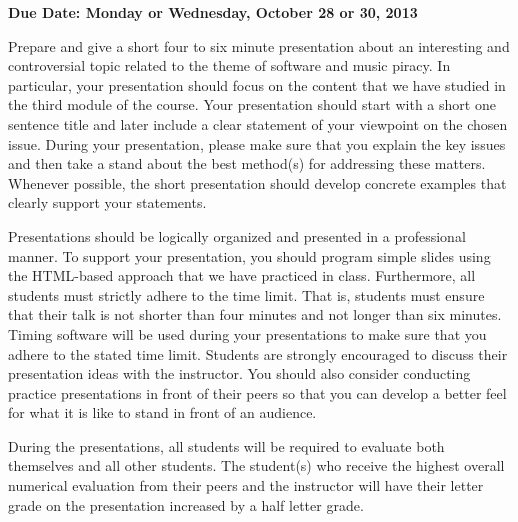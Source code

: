 

\usepackage[compact]{titlesec}



\vspace*{-.2in}
\begin{center}
	{\bf Due Date: Monday or Wednesday, October 28 or 30, 2013}
\end{center}

Prepare and give a short four to six minute presentation about an interesting and controversial topic related to the
theme of software and music piracy. In particular, your presentation should focus on the content that we have studied in
the third module of the course. Your presentation should start with a short one sentence title and later include a clear
statement of your viewpoint on the chosen issue. During your presentation, please make sure that you explain the key
issues and then take a stand about the best method(s) for addressing these matters. Whenever possible, the short
presentation should develop concrete examples that clearly support your statements.

Presentations should be logically organized and presented in a professional manner. To support your presentation, you
should program simple slides using the HTML-based approach that we have practiced in class. Furthermore, all
students must strictly adhere to the time limit. That is, students must ensure that their talk is not shorter than four
minutes and not longer than six minutes. Timing software will be used during your presentations to make sure that you
adhere to the stated time limit. Students are strongly encouraged to discuss their presentation ideas with the
instructor.  You should also consider conducting practice presentations in front of their peers so that you can develop
a better feel for what it is like to stand in front of an audience.

During the presentations, all students will be required to evaluate both themselves and all other students.  The student(s)
who receive the highest overall numerical evaluation from their peers and the instructor will have their letter grade on
the presentation increased by a half letter grade.


